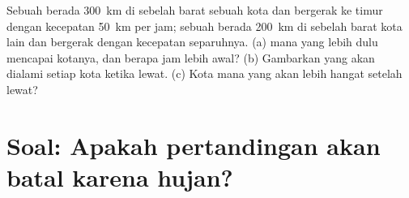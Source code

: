 \begin{exercise}[$\star\star\star$]\label{exo:g8:fronts-and-weather-maps:12}
Sebuah  berada \qty{300}{km} di sebelah barat sebuah kota dan
bergerak ke timur dengan kecepatan \qty{50}{km} per jam; sebuah  berada \qty{200}{km} di sebelah barat kota lain dan bergerak dengan
kecepatan separuhnya. (a)  mana yang lebih dulu mencapai kotanya, dan
berapa jam lebih awal? (b) Gambarkan  yang akan dialami setiap kota
ketika  lewat. (c) Kota mana yang akan lebih hangat setelah
 lewat?
\end{exercise}

\section{Soal: Apakah pertandingan akan batal karena hujan?}

